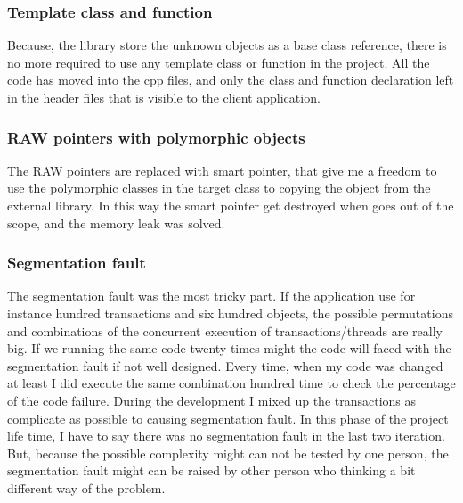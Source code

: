 \documentclass[12pt]{article}
\begin{document}
\subsubsection{Template class and function }
Because, the library store the unknown objects as a base class reference, there is no more required to use any template class or function in the project. All the code has moved into the cpp files, and only the class and function declaration left in the header files that is visible to the client application.

\subsubsection{RAW pointers with polymorphic objects}
The RAW pointers are replaced with smart pointer, that give me a freedom to use the polymorphic classes in the target class to copying the object from the external library. In this way the smart pointer get destroyed when goes out of the scope, and the memory leak was solved.

\subsubsection{Segmentation fault}
The segmentation fault was the most tricky part. If the application use for instance hundred transactions and six hundred objects, the possible permutations and combinations of the concurrent execution of transactions/threads are really big. If we running the same code twenty times might the code will faced with the segmentation fault if not well designed. Every time, when my code was changed at least I did execute the same combination hundred time to check the percentage of the code failure. During the development  I mixed up the transactions as complicate as possible to causing segmentation fault. In this phase of the project life time, I have to say there was no segmentation fault in the last two iteration. But, because the possible complexity might can not be tested by one person, the segmentation fault might can be raised by other person who thinking a bit different way of the problem.\\   
   
\newpage
\end{document}

